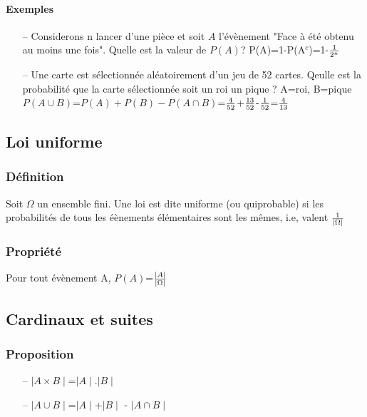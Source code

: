 \documentclass{article}
\begin{document}
                \paragraph{Exemples}
                    \begin{itemize}
                        \item[--] Considerons n lancer d'une pièce et soit $A$ l'évènement
                        "Face à été obtenu au moins une fois". Quelle est la valeur de $P(A)$?
                        P(A)=1-P(A$^c$)=1-$1\over{2^n}$
                        \item[--] Une carte est sélectionnée aléatoirement d'un jeu de 52 cartes.
                        Qeulle est la probabilité que la carte sélectionnée soit un roi un pique ?
                        A={roi}, B={pique}
                        $P(A \cup B)$=$P(A)+P(B)-P(A \cap B)$=$4\over{52}$+$13\over{52}$-$1\over{52}$=$4\over{13}$ 
                    \end{itemize}
        \subsection{Loi uniforme}
            \subsubsection{Définition}
                Soit $\Omega$ un ensemble fini. Une loi est dite uniforme (ou quiprobable) si
                les probabilités de tous les éènements élémentaires sont les mêmes, i.e, valent
                $1\over{\mid \Omega \mid}$
            \subsubsection{Propriété}
                Pour tout évènement A, $P(A)$=${\mid A \mid}\over{\mid \Omega \mid}$
        \subsection{Cardinaux et suites}
            \subsubsection{Proposition}
                \begin{itemize}
                    \item[--] $\mid A \times B \mid$=$\mid A \mid$.$\mid B \mid$
                    \item[--] $\mid A \cup B\mid$=$\mid A \mid$+$\mid B \mid$ - $\mid A \cap B \mid$
                \end{itemize}
\end{document}
